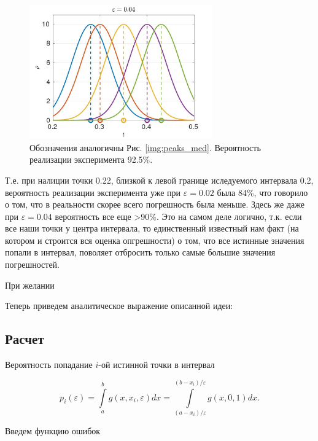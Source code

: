 \documentclass[a4paper,12pt]{article} %
\begin{document}
\begin{figure}[h!]
\begin{center}
\includegraphics[width=0.7\textwidth]{./pics/peaks_smooth}
\end{center}
\caption{Обозначения аналогичны Рис. \ref{img:peaks_med}. Вероятность реализации эксперимента 92.5\%.} \label{img:peaks_smooth}
\end{figure}

Т.е. при налиции точки 0.22, близкой к левой границе иследуемого интервала 0.2, вероятность реализации эксперимента уже при $\varepsilon = 0.02$ была 84\%, что говорило о том, что в реальности скорее всего погрешность была меньше. Здесь же даже при $\varepsilon = 0.04$ вероятность все еще >90\%. Это на самом деле логично, т.к. если все наши точки у центра интервала, то единственный известный нам факт (на котором и строится вся оценка опгрешности) о том, что все истинные значения попали в интервал, поволяет отбросить только самые большие значения погрешностей.

При желании 

Теперь приведем аналитическое выражение описанной идеи:

\newpage

\subsection{Расчет}

Вероятность попадание $i$-ой истинной точки в интервал

\begin{equation}
p_i(\varepsilon) = \int\limits_a^b g \left(x, x_i, \varepsilon \right) dx = \int\limits_{(a-x_i)/\varepsilon}^{(b-x_i)/\varepsilon} g(x, 0, 1) dx.
\end{equation}

Введем функцию ошибок
\end{document}
